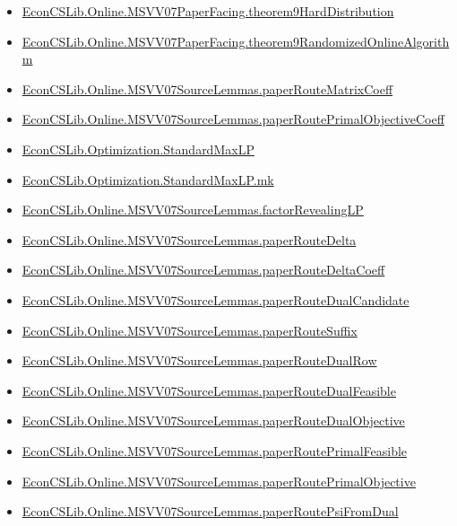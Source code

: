 \documentclass[10pt]{article}
\begin{document}
\begin{itemize}[leftmargin=1.2em]
\begin{itemize}[leftmargin=1.2em]
\item \hyperlink{library-prerequisite-5a5b5461c977cae8}{EconCSLib.Online.MSVV07PaperFacing.theorem9HardDistribution}
\item \hyperlink{library-prerequisite-6caff94db2519b38}{EconCSLib.Online.MSVV07PaperFacing.theorem9RandomizedOnlineAlgorithm}
\item \hyperlink{library-prerequisite-3c7c0a105e72943c}{EconCSLib.Online.MSVV07SourceLemmas.paperRouteMatrixCoeff}
\item \hyperlink{library-prerequisite-a0bac122e8cb1494}{EconCSLib.Online.MSVV07SourceLemmas.paperRoutePrimalObjectiveCoeff}
\item \hyperlink{library-prerequisite-fd436bc7cd6eac53}{EconCSLib.Optimization.StandardMaxLP}
\item \hyperlink{library-prerequisite-8c32fec40a0b84ea}{EconCSLib.Optimization.StandardMaxLP.mk}
\item \hyperlink{library-prerequisite-baae9534af7d9038}{EconCSLib.Online.MSVV07SourceLemmas.factorRevealingLP}
\item \hyperlink{library-prerequisite-daff70594ebeccd5}{EconCSLib.Online.MSVV07SourceLemmas.paperRouteDelta}
\item \hyperlink{library-prerequisite-d8721cd50c48f40a}{EconCSLib.Online.MSVV07SourceLemmas.paperRouteDeltaCoeff}
\item \hyperlink{library-prerequisite-85c8bc47282420b8}{EconCSLib.Online.MSVV07SourceLemmas.paperRouteDualCandidate}
\item \hyperlink{library-prerequisite-75a2857373c82276}{EconCSLib.Online.MSVV07SourceLemmas.paperRouteSuffix}
\item \hyperlink{library-prerequisite-0dba8256de684398}{EconCSLib.Online.MSVV07SourceLemmas.paperRouteDualRow}
\item \hyperlink{library-prerequisite-6675c404806caa66}{EconCSLib.Online.MSVV07SourceLemmas.paperRouteDualFeasible}
\item \hyperlink{library-prerequisite-110c7446e7136b65}{EconCSLib.Online.MSVV07SourceLemmas.paperRouteDualObjective}
\item \hyperlink{library-prerequisite-b7813d28bd002050}{EconCSLib.Online.MSVV07SourceLemmas.paperRoutePrimalFeasible}
\item \hyperlink{library-prerequisite-7384768ec125335f}{EconCSLib.Online.MSVV07SourceLemmas.paperRoutePrimalObjective}
\item \hyperlink{library-prerequisite-457e66f164223668}{EconCSLib.Online.MSVV07SourceLemmas.paperRoutePsiFromDual}

\end{itemize}
\end{itemize}
\end{document}
